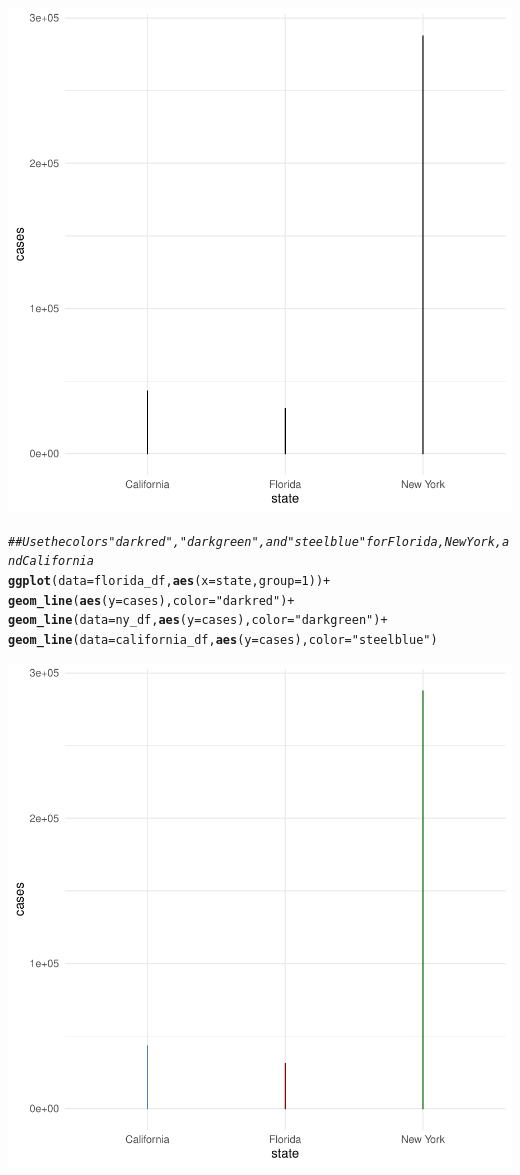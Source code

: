 \documentclass{article}\usepackage[]{graphicx}\usepackage[]{xcolor}
\makeatletter
\newcommand{\hlnum}[1]{\textcolor[rgb]{0.686,0.059,0.569}{#1}}%
\newcommand{\hlstr}[1]{\textcolor[rgb]{0.192,0.494,0.8}{#1}}%
\newcommand{\hlcom}[1]{\textcolor[rgb]{0.678,0.584,0.686}{\textit{#1}}}%
\newcommand{\hlopt}[1]{\textcolor[rgb]{0,0,0}{#1}}%
\newcommand{\hlstd}[1]{\textcolor[rgb]{0.345,0.345,0.345}{#1}}%
\newcommand{\hlkwc}[1]{\textcolor[rgb]{0.333,0.667,0.333}{#1}}%
\newcommand{\hlkwd}[1]{\textcolor[rgb]{0.737,0.353,0.396}{\textbf{#1}}}%
\newenvironment{kframe}{%
 \def\at@end@of@kframe{}%
 \ifinner\ifhmode%
  \def\at@end@of@kframe{\end{minipage}}%
  \begin{minipage}{\columnwidth}%
 \fi\fi%
 \def\FrameCommand##1{\hskip\@totalleftmargin \hskip-\fboxsep
 \colorbox{shadecolor}{##1}\hskip-\fboxsep
     \hskip-\linewidth \hskip-\@totalleftmargin \hskip\columnwidth}%
 \MakeFramed {\advance\hsize-\width
   \@totalleftmargin\z@ \linewidth\hsize
   \@setminipage}}%
 {\par\unskip\endMakeFramed%
 \at@end@of@kframe}
\newenvironment{knitrout}{}{} %
\makeatother
\begin{document}
\begin{knitrout}
{\centering \includegraphics[width=.6\linewidth]{figure/assignment-04-Quintero-Vasquez-Johnatan-Rnwauto-report-7} 

}


\begin{kframe}\begin{alltt}
\hlcom{## Use the colors "darkred", "darkgreen", and "steelblue" for Florida, New York, and California}
\hlkwd{ggplot}\hlstd{(}\hlkwc{data}\hlstd{=florida_df,} \hlkwd{aes}\hlstd{(}\hlkwc{x}\hlstd{=state,} \hlkwc{group}\hlstd{=}\hlnum{1}\hlstd{))} \hlopt{+}
  \hlkwd{geom_line}\hlstd{(}\hlkwd{aes}\hlstd{(}\hlkwc{y} \hlstd{= cases),} \hlkwc{color} \hlstd{=} \hlstr{"darkred"}\hlstd{)} \hlopt{+}
  \hlkwd{geom_line}\hlstd{(}\hlkwc{data}\hlstd{=ny_df,} \hlkwd{aes}\hlstd{(}\hlkwc{y} \hlstd{= cases),} \hlkwc{color} \hlstd{=} \hlstr{"darkgreen"}\hlstd{)} \hlopt{+}
  \hlkwd{geom_line}\hlstd{(}\hlkwc{data}\hlstd{=california_df,} \hlkwd{aes}\hlstd{(}\hlkwc{y} \hlstd{= cases),} \hlkwc{color} \hlstd{=} \hlstr{"steelblue"}\hlstd{)}
\end{alltt}
\end{kframe}

{\centering \includegraphics[width=.6\linewidth]{figure/assignment-04-Quintero-Vasquez-Johnatan-Rnwauto-report-8} 

}
\end{knitrout}
\end{document}
